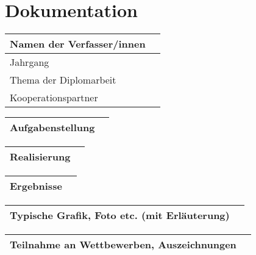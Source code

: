 \chapter{Dokumentation}

\renewcommand{\arraystretch}{2} %

\begin{tabular}{|m{}|m{}|}
\hline
Namen der Verfasser/innen & \\
\hline
Jahrgang & \\
\hline
Thema der Diplomarbeit &  \\
\hline
Kooperationspartner & \\
\hline
\end{tabular}

\vspace{10pt}

\noindent
\begin{tabular}{|m{}|m{}|}
\hline
Aufgabenstellung & \\
\hline
\end{tabular}

\pagebreak

\noindent
\begin{tabular}{|m{}|m{}|}
\hline
Realisierung & \\
\hline
\end{tabular}

\vspace{10pt}

\noindent
\begin{tabular}{|m{}|m{}|}
\hline
Ergebnisse & \\
\hline
\end{tabular}

\pagebreak

\noindent
\begin{tabular}{|m{}|m{}|}
\hline
Typische Grafik, Foto etc. (mit Erläuterung) & \\
\hline
\end{tabular}

\vspace{10pt}

\noindent
\begin{tabular}{|m{}|m{}|}
\hline
Teilnahme an Wettbewerben, Auszeichnungen & \\
\hline
\end{tabular}

